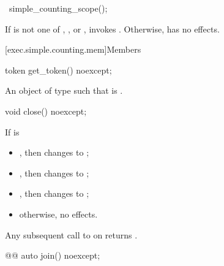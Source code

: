 %
\begin{itemdecl}
~simple_counting_scope();
\end{itemdecl}

\begin{itemdescr}
\pnum
\effects
If  is not one of
, , or ,
invokes .
Otherwise, has no effects.
\end{itemdescr}

[exec.simple.counting.mem]{Members}

%
\begin{itemdecl}
token get_token() noexcept;
\end{itemdecl}

\begin{itemdescr}
\pnum
\returns
An object  of type  such that
 is .
\end{itemdescr}

%
\begin{itemdecl}
void close() noexcept;
\end{itemdecl}

\begin{itemdescr}
\pnum
\effects
If  is
\begin{itemize}
\item
{}, then changes  to ;
\item
{}, then changes  to ;
\item
{},
then changes  to ;
\item
otherwise, no effects.
\end{itemize}

\pnum
\ensures
Any subsequent call to  on 
returns .
\end{itemdescr}

%
\begin{itemdecl}
@@ auto join() noexcept;
\end{itemdecl}

